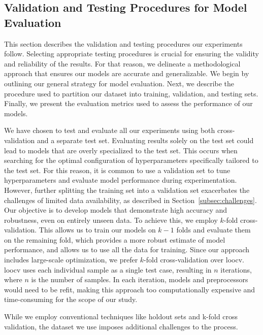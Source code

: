 \subsection{Validation and Testing Procedures for Model Evaluation}\label{subsec:validation_testing_procedures}
This section describes the validation and testing procedures our experiments follow.
Selecting appropriate testing procedures is crucial for ensuring the validity and reliability of the results.
For that reason, we delineate a methodological approach that ensures our models are accurate and generalizable.
We begin by outlining our general strategy for model evaluation.
Next, we describe the procedure used to partition our dataset into training, validation, and testing sets.
Finally, we present the evaluation metrics used to assess the performance of our models.

We have chosen to test and evaluate all our experiments using both cross-validation and a separate test set.
Evaluating results solely on the test set could lead to models that are overly specialized to the test set.
This occurs when searching for the optimal configuration of hyperparameters specifically tailored to the test set.
For this reason, it is common to use a validation set to tune hyperparameters and evaluate model performance during experimentation.
However, further splitting the training set into a validation set exacerbates the challenges of limited data availability, as described in Section~\ref{subsec:challenges}.
Our objective is to develop models that demonstrate high accuracy and robustness, even on entirely unseen data.
To achieve this, we employ $k$-fold cross-validation.
This allows us to train our models on $k-1$ folds and evaluate them on the remaining fold, which provides a more robust estimate of model performance, and allows us to use all the data for training.
Since our approach includes large-scale optimization, we prefer $k$-fold cross-validation over \gls{loocv}.
\gls{loocv} uses each individual sample as a single test case, resulting in $n$ iterations, where $n$ is the number of samples.
In each iteration, models and preprocessors would need to be refit, making this approach too computationally expensive and time-consuming for the scope of our study.

While we employ conventional techniques like holdout sets and k-fold cross validation, the dataset we use imposes additional challenges to the process.

